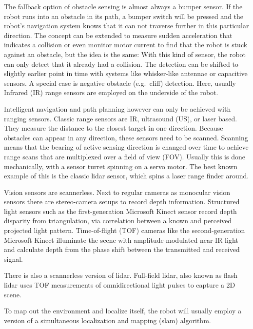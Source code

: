 The fallback option of obstacle sensing is almost always a bumper
sensor. If the robot runs into an obstacle in its path, a bumper switch
will be pressed and the robot's navigation system knows that it can not
traverse further in this particular direction. The concept can be
extended to measure sudden acceleration that indicates a collision or
even monitor motor current to find that the robot is stuck against an
obstacle, but the idea is the same: With this kind of sensor, the robot
can only detect that it already had a collision. The detection can be
shifted to slightly earlier point in time with systems like whisker-like
antennae or capacitive sensors\cite{Muhlbacher-Karrer2015}. A special
case is negative obstacle (e.g.~cliff) detection. Here, usually Infrared
(IR) range sensors are employed on the underside of the robot.

Intelligent navigation and path planning however can only be achieved
with ranging sensors. Classic range sensors are IR, ultrasound (US), or
laser based. They measure the distance to the closest target in one
direction. Because obstacles can appear in any direction, these sensors
need to be scanned. Scanning means that the bearing of active sensing
direction is changed over time to achieve range scans that are
multiplexed over a field of view (FOV). Usually this is done
mechanically, with a sensor turret spinning on a servo motor. The best
known example of this is the classic lidar sensor, which spins a laser
range finder around.

Vision sensors are scannerless. Next to regular cameras as monocular
vision sensors there are stereo-camera setups to record depth
information. Structured light sensors such as the first-generation
Microsoft Kinect sensor record depth disparity from triangulation, via
correlation between a known and perceived projected light pattern.
Time-of-flight (TOF) cameras like the second-generation Microsoft Kinect
illuminate the scene with amplitude-modulated near-IR light and
calculate depth from the phase shift between the transmitted and
received signal\cite{Sarbolandi2015}.

There is also a scannerless version of lidar. Full-field lidar, also
known as flash lidar \cite{Payne2008} uses TOF measurements of
omnidirectional light pulses to capture a 2D scene.

To map out the environment and localize itself, the robot will usually
employ a version of a simultaneous localization and mapping (slam)
algorithm\cite{Cadena2016}.

